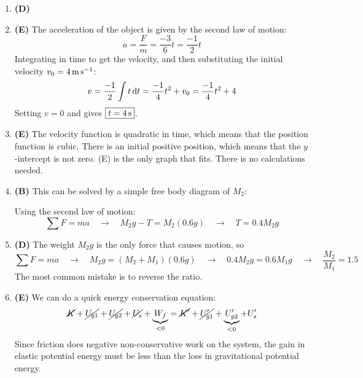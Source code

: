 \documentclass{../oss-handout}
\begin{document}
\begin{enumerate}[leftmargin=17pt]
\item\textbf{(D)}
  
\item\textbf{(E)} The acceleration of the object is given by the second law of
  motion:
  \begin{displaymath}
    a=\frac Fm=\frac{-3}6t=\frac{-1}2t
  \end{displaymath}
  Integrating in time to get the velocity, and then substituting the initial
  velocity $v_0=\SI4{\metre\per\second}$:
  \begin{displaymath}
    v=\frac{-1}2\int t\dl t=\frac{-1}4t^2+v_0=\frac{-1}4t^2+4
  \end{displaymath}
  Setting $v=0$ and gives $\boxed{t=\SI4\second}$.

\item\textbf{(E)} The velocity function is quadratic in time, which means that
  the position function is cubic. There is an initial positive position, which
  means that the $y$-intercept is not zero. (E) is the only graph that fits.
  There is no calculations needed.
  \newpage
  
\item\textbf{(B)} This can be solved by a simple free body diagram of $M_2$:
  \begin{center}
  \end{center}
  Using the second law of motion:
  \begin{displaymath}
    \sum F=ma\quad\longrightarrow\quad
    M_2g-T=M_2(0.6g)\quad\longrightarrow\quad T=\boxed{0.4M_2g}
  \end{displaymath}

\item\textbf{(D)} The weight $M_2g$ is the only force that causes motion, so
  \begin{displaymath}
    \sum F=ma\quad\longrightarrow\quad
    M_2g=(M_2+M_1)(0.6g)\quad\longrightarrow\quad
    0.4M_2g=0.6M_1g\quad\longrightarrow\quad
    \frac{M_2}{M_1}=\boxed{1.5}
  \end{displaymath}
  The most common mistake is to reverse the ratio.

\item\textbf{(E)} We can do a quick energy conservation equation:
  \begin{displaymath}
    \cancel{K} +\cancel{U_{g1}} +\cancel{U_{g2}}+\cancel{U_s}+
    \underbrace{W_f}_{<0}=
    \cancel{K'}+\cancel{U_{g1}'}+\underbrace{U_{g2}'}_{<0}+U_s'
  \end{displaymath}
  Since friction does negative non-conservative work on the system, the gain
  in elastic potential energy must be less than the loss in gravitational
  potential energy.
  

\end{enumerate}
\end{document}
